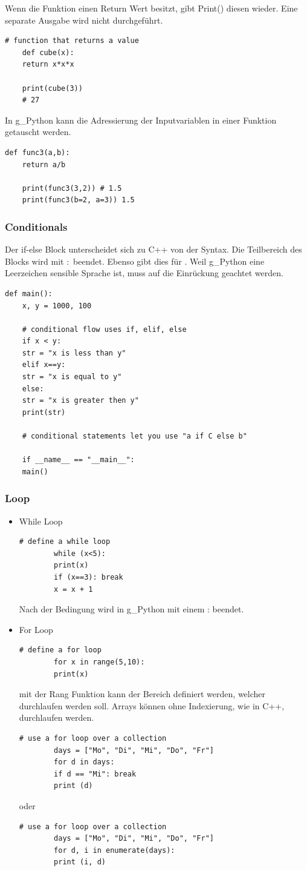 Wenn die Funktion einen Return Wert besitzt, gibt Print() diesen wieder. Eine separate Ausgabe wird nicht durchgeführt.
\begin{lstlisting}[style=python]
	# function that returns a value
	def cube(x):
	return x*x*x
	
	print(cube(3))
	# 27
\end{lstlisting}
In \gls{g_Python} kann die Adressierung der Inputvariablen in einer Funktion getauscht werden.
\begin{lstlisting}[style=python]
	def func3(a,b):
	return a/b
	
	print(func3(3,2)) # 1.5
	print(func3(b=2, a=3)) 1.5
\end{lstlisting}

\subsubsection{Conditionals}
Der if-else Block unterscheidet sich zu C++ von der Syntax. Die Teilbereich des  Blocks wird mit $:$ beendet. Ebenso gibt dies für .
Weil \gls{g_Python} eine Leerzeichen sensible Sprache ist, muss auf die Einrückung geachtet werden.

\begin{lstlisting}[style=python]
	def main():
	x, y = 1000, 100
	
	# conditional flow uses if, elif, else
	if x < y:
	str = "x is less than y"
	elif x==y:
	str = "x is equal to y"
	else:
	str = "x is greater then y"
	print(str)
	
	# conditional statements let you use "a if C else b"
	
	if __name__ == "__main__":
	main()
\end{lstlisting}
\subsubsection{Loop}
\begin{itemize}
	\item While Loop
	\begin{lstlisting}[style=python]
		# define a while loop
		while (x<5):
		print(x)
		if (x==3): break
		x = x + 1
	\end{lstlisting}
	Nach der Bedingung wird in \gls{g_Python} mit einem : beendet.
	\item For Loop
	\begin{lstlisting}[style=python]
		# define a for loop
		for x in range(5,10):
		print(x)
	\end{lstlisting}
	mit der Rang Funktion kann der Bereich definiert werden, welcher durchlaufen werden soll. Arrays können ohne Indexierung, wie in C++, durchlaufen werden.
	\begin{lstlisting}[style=python]
		# use a for loop over a collection
		days = ["Mo", "Di", "Mi", "Do", "Fr"]
		for d in days:
		if d == "Mi": break
		print (d)
	\end{lstlisting}
	oder 
	\begin{lstlisting}[style=python]
		# use a for loop over a collection
		days = ["Mo", "Di", "Mi", "Do", "Fr"]
		for d, i in enumerate(days):
		print (i, d)
	\end{lstlisting}
\end{itemize}

